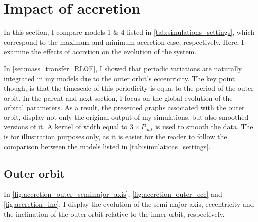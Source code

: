 \section{Impact of accretion}\label{sec:accretion}

In this section, I compare models  1 \& 4 listed in \cref{tab:simulations_settings}, which correspond to the maximum and minimum accretion case, respectively. Here, I examine the effects of accretion on the evolution of the system.

In \cref{sec:mass_transfer_RLOF}, I showed that periodic variations are naturally integrated in my models due to the outer orbit's eccentricity. The key point though, is that the timescale of this periodicity is equal to the period of the outer orbit. In the parent and next section, I focus on the global evolution of the orbital parameters. As a result, the presented graphs associated with the outer orbit, display not only the original output of my simulations, but also smoothed versions of it. A kernel of width equal to $3 \times P_{out}$ is used to smooth the data. The is for illustration purposes only, as it is easier for the reader to follow the comparison between the models listed in \cref{tab:simulations_settings}. 

\subsection{Outer orbit}

In \cref{fig:accretion_outer_semimajor_axis}, \cref{fig:accretion_outer_ecc} and \cref{fig:accretion_inc}, I display the evolution of the semi-major axis, eccentricity and the inclination of the outer orbit relative to the inner orbit, respectively.

